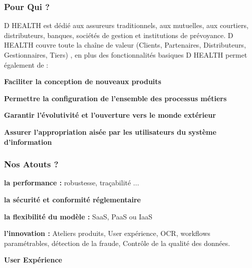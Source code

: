 \subsubsection{\Large Pour Qui ?}
D HEALTH est dédié aux assureurs traditionnels, aux mutuelles, aux
courtiers, distributeurs, banques, sociétés de gestion et institutions
de prévoyance.
D HEALTH couvre toute la chaîne de valeur (Clients, Partenaires,
Distributeurs, Gestionnaires, Tiers) , en plus des fonctionnalités
basiques D HEALTH permet également de :
\begin{itemize}[font=\normalsize]
                \textbf{Faciliter la conception de nouveaux produits }
                
\end{itemize}
\begin{itemize}[font=\normalsize]
                \textbf{Permettre la configuration de l’ensemble des processus métiers}
                \end{itemize}
                \begin{itemize}[font=\normalsize]
                \textbf{Garantir l’évolutivité et l’ouverture vers le monde extérieur}
                \end{itemize}
                \begin{itemize}[font=\normalsize]
                \textbf{Assurer l’appropriation aisée par les utilisateurs du système
d’information}
                \end{itemize}
                \subsubsection{Nos Atouts ?}
                \begin{itemize}[font=\normalsize]
                 \textbf{la performance :} robustesse, traçabilité ...
                 \end{itemize}
                 \begin{itemize}[font=\normalsize]
                  \textbf{la sécurité et conformité réglementaire}
                  \end{itemize}
                  \begin{itemize}[font=\normalsize]
                   \textbf{la flexibilité du modèle :} SaaS, PaaS ou IaaS
                   \end{itemize}
                   \begin{itemize}[font=\normalsize]
                    \textbf{l’innovation :} Ateliers produits,
User expérience,
OCR,
workflows paramétrables,
détection de la fraude,
Contrôle de la qualité des données.
                    \end{itemize}
                    \begin{itemize}[font=\normalsize]
                     \textbf{User Expérience}
                     \end{itemize}
                     
